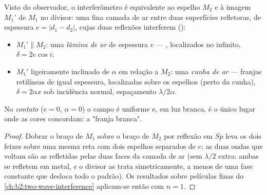 \begin{proposition}\label{prop:b2:michelson:equivalent}
Visto do observador, o interferômetro é equivalente ao espelho
$M_2$ e à imagem $M_1'$ de $M_1$ no divisor: uma fina camada de ar
entre duas superfícies refletoras, de espessura $e = |d_1 - d_2|$, cujas
duas reflexões interferem ():
\begin{itemize}
  \item $M_1' \parallel M_2$: uma \emph{lâmina de ar} de espessura $e$ --- , localizados no infinito, $\delta = 2e\cos i$;
  \item $M_1'$ ligeiramente inclinado de $\alpha$ em relação a $M_2$: uma \emph{cunha de ar}
        --- franjas retilíneas de igual espessura, localizadas sobre os
        espelhos (perto da cunha), $\delta = 2\alpha x$ sob incidência normal,
        espaçamento $\lambda/2\alpha$.
\end{itemize}
No \emph{contato} ($e = 0$, $\alpha = 0$) o campo é uniforme e, em luz
branca, é o único lugar onde as cores concordam: a "franja branca".
\end{proposition}

\begin{proof}
Dobrar o braço de $M_1$ sobre o braço de $M_2$ por reflexão em $Sp$ leva os
dois feixes sobre uma mesma reta com dois espelhos separados de $e$; as duas ondas
que voltam são as refletidas pelas duas faces da camada de ar (sem
$\lambda/2$ extra: ambas se refletem em metal, e o divisor as trata
simetricamente, a menos de uma fase constante que desloca todo o padrão).
Os resultados sobre películas finas do \cref{ch:b2:two-wave-interference} aplicam-se então
com $n = 1$.
\end{proof}

